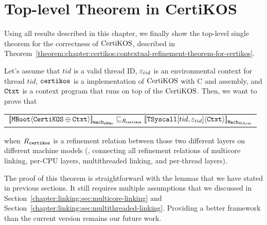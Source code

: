 \section{Top-level Theorem in CertiKOS}
\label{chapter:certikos:sec:top-level-theorem}


Using all results described in this chapter, 
we finally show the top-level single theorem for the correctness of $\mathrm{CertiKOS}$, 
described in Theorem~\ref{theorem:chapter:certikos:contextual-refinement-theorem-for-certikos}. 

\begin{theorem}
\label{theorem:chapter:certikos:contextual-refinement-theorem-for-certikos}
Let's assume that $tid$ is a valid thread ID, ${\varepsilon}_{tid}$ is an
environmental context for thread $tid$, ${\mathrm{\texttt{certikos}}}$ is a implementation of $\mathrm{CertiKOS}$ with C and assembly, and ${\mathrm{\texttt{Ctxt}}}$ is a
 context program that runs on top of the $\mathrm{CertiKOS}$. 
 Then, we want to prove that 
 \begin{center}
\begin{tabular}{c}
${[\![{{\mathrm{\texttt{MBoot}}}} \langle {{\mathrm{\texttt{CertiKOS}}} \oplus {\mathrm{\texttt{Ctxt}}}} \rangle]\!]}_{{\mathrm{\texttt{mach}}}_{{\mathrm{\texttt{x86mc}}}}} \sqsubseteq_{R_{{\mathrm{\texttt{certikos}}}}} {[\![{{{\mathrm{\texttt{TSyscall}}}}[tid, {\varepsilon}_{tid}]} \langle {{\mathrm{\texttt{Ctxt}}}} \rangle]\!]}_{{\mathrm{\texttt{Mach}}}_{\mathrm{HAsm}}}$\\
\end{tabular}
\end{center}
when $R_{{\mathrm{\texttt{certikos}}}}$ is a refinement relation between those two different layers on different machine models (\ie, connecting all refinement relations of multicore linking, per-CPU layers, multithreaded linking, and per-thread layers).
\end{theorem}

The proof of this theorem is 
straightforward with 
the lemmas that we have stated in previous sections.
It still requires multiple assumptions that we discussed 
in Section~\ref{chapter:linking:sec:multicore-linking} and Section~\ref{chapter:linking:sec:multithreaded-linking}. 
Providing a better framework than the current version remains our future work. 

%
%

